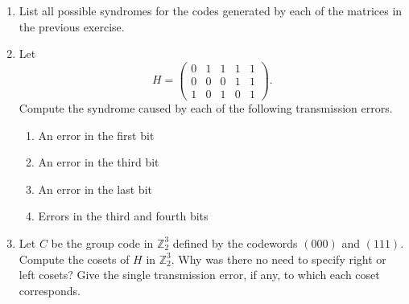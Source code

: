 {\begin{enumerate}
\begin{multicols}{2}
\begin{enumerate}
\item
\[
\begin{pmatrix}
0 & 1 & 1 & 0 & 0 & 0 \\
1 & 1 & 0 & 1 & 0 & 0 \\
0 & 1 & 0 & 0 & 1 & 0 \\
1 & 1 & 0 & 0 & 0 & 1
\end{pmatrix}
\]

\item
\[
\begin{pmatrix}
1 & 1 & 1 & 0 \\
1 & 0 & 0 & 1
\end{pmatrix}
\]

\item
\[
\begin{pmatrix}
0 & 0 & 0 & 1 & 0 & 0 & 0 \\
0 & 1 & 1 & 0 & 1 & 0 & 0 \\
1 & 0 & 1 & 0 & 0 & 1 & 0 \\
0 & 1 & 1 & 0 & 0 & 0 & 1
\end{pmatrix}
\]

\end{enumerate}
\end{multicols}
 

\item %
List all possible syndromes for the codes generated by each of the
matrices in the previous exercise. 
 
 
\item
Let
\[
H =
\begin{pmatrix}
0 & 1 & 1 & 1 & 1 \\
0 & 0 & 0 & 1 & 1 \\
1 & 0 & 1 & 0 & 1
\end{pmatrix}.
\]
Compute the syndrome caused by each of the following transmission
errors. 
\begin{enumerate}
 
 \item 
An error in the first bit
 
 \item 
An error in the third bit
 
 \item 
An error in the last bit
 
 \item 
Errors in the third and fourth bits
 
\end{enumerate}
 
 
\item
Let $C$ be the group code in ${\mathbb Z}_2^3$ defined by the codewords
$(000)$ and $(111)$. Compute the cosets of $H$ in ${\mathbb Z}_2^3$. Why
was there no need to specify right or left cosets? Give the
single transmission error, if any, to which each coset corresponds.
 


\end{enumerate}}
